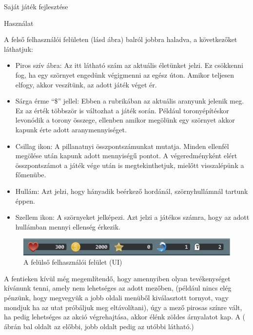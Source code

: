 \begin{MyChapter}{Saját játék fejlesztése}
\begin{MySection}{Használat}
	
		A felső felhasználói felületen (lásd  ábra) balról jobbra haladva, a következőket láthatjuk:
		
		\begin{itemize}
			\item Piros szív ábra: Az itt látható szám az aktuális életünket jelzi. Ez csökkenni fog, ha egy szörnyet engedünk végigmenni az egész úton. Amikor teljesen elfogy, akkor veszítünk, az adott játék véget ér.
			
			\item Sárga érme ``\$'' jellel: Ebben a rubrikában az aktuális aranyunk jelenik meg. Ez az érték többször is változhat a játék során. Például toronyépítéskor levonódik a torony összege, ellenben amikor megölünk egy szörnyet akkor kapunk érte adott aranymennyiséget.
			
			\item Csillag ikon: A pillanatnyi összpontszámunkat mutatja. Minden ellenfél megölése után kapunk adott mennyiségű pontot. A végeredményként elért összpontszámot a játék vége után is megtekinthetjuk, mielőtt visszalépünk a főmenübe.
			
			\item Hullám: Azt jelzi, hogy hányadik beérkező hordánál, szörnyhullámnál tartunk éppen.
			
			\item Szellem ikon: A szörnyeket jelképezi. Azt jelzi a játékos számra, hogy az adott hullámban mennyi ellenség érkezik.
		\end{itemize}
	
		\begin{figure}[H]
			\centering
			\includegraphics[scale=0.58]{kepek/jatekHasznalat/felso_ui}
			\caption{A felülső felhasználói felület (UI) }
			\label{fig:jatekHasznalat:felso_ui}
		\end{figure}
	
		A fentieken kívül még megemlítendő, hogy amennyiben olyan tevékenységet kívánunk tenni, amely nem lehetséges az adott mezőben, (például nincs elég pénzünk, hogy megvegyük a jobb oldali menüből kiválasztott tornyot, vagy mondjuk ha az utat próbáljuk meg eltávolítani), úgy a mező pirosas színre vált, ha pedig lehetséges az akció végrehajtása, akkor élénk zöldes árnyalatot kap. A ( ábrán bal oldalt az előbbi, jobb oldalt pedig az utóbbi látható.)
		

\end{MySection}
\end{MyChapter}
